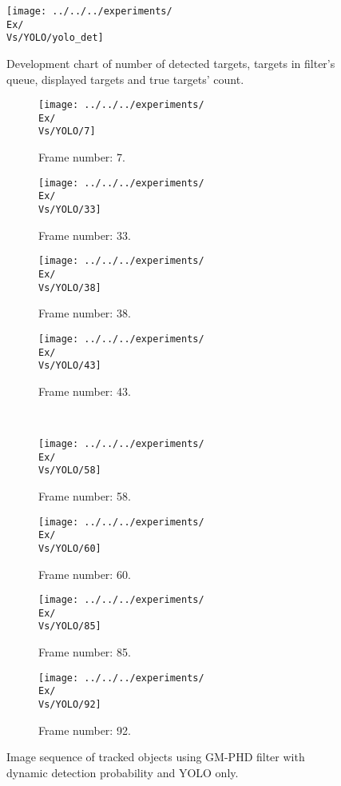 \begin{figure}[H]
    \centering
    \texttt{[image: ../../../experiments/\\Ex/\\Vs/YOLO/yolo\_det]}
    \caption{Development chart of number of detected targets, targets in filter's queue, displayed targets and true targets' count.}
    \label{gr:\Ex-\Vs-\Set}
\end{figure}

\begin{figure}[H]
    \centering
    \begin{subfigure}{0.23\textwidth}
        \centering
        \texttt{[image: ../../../experiments/\\Ex/\\Vs/YOLO/7]}
        \caption{Frame number: 7.}
        \label{fig:\Ex-\Vs-\Set:01}
    \end{subfigure}
    \begin{subfigure}{0.23\textwidth}
        \centering
        \texttt{[image: ../../../experiments/\\Ex/\\Vs/YOLO/33]}
        \caption{Frame number: 33.}
        \label{fig:\Ex-\Vs-\Set:02}
    \end{subfigure}
    \begin{subfigure}{0.23\textwidth}
        \centering
        \texttt{[image: ../../../experiments/\\Ex/\\Vs/YOLO/38]}
        \caption{Frame number: 38.}
        \label{fig:\Ex-\Vs-\Set:03}
    \end{subfigure}
    \begin{subfigure}{0.23\textwidth}
        \centering
        \texttt{[image: ../../../experiments/\\Ex/\\Vs/YOLO/43]}
        \caption{Frame number: 43.}
        \label{fig:\Ex-\Vs-\Set:04}
    \end{subfigure}
    \\
    \begin{subfigure}{0.23\textwidth}
        \centering
        \texttt{[image: ../../../experiments/\\Ex/\\Vs/YOLO/58]}
        \caption{Frame number: 58.}
        \label{fig:\Ex-\Vs-\Set:05}
    \end{subfigure}
    \begin{subfigure}{0.23\textwidth}
        \centering
        \texttt{[image: ../../../experiments/\\Ex/\\Vs/YOLO/60]}
        \caption{Frame number: 60.}
        \label{fig:\Ex-\Vs-\Set:06}
    \end{subfigure}
    \begin{subfigure}{0.23\textwidth}
        \centering
        \texttt{[image: ../../../experiments/\\Ex/\\Vs/YOLO/85]}
        \caption{Frame number: 85.}
        \label{fig:\Ex-\Vs-\Set:07}
    \end{subfigure}
    \begin{subfigure}{0.23\textwidth}
        \centering
        \texttt{[image: ../../../experiments/\\Ex/\\Vs/YOLO/92]}
        \caption{Frame number: 92.}
        \label{fig:\Ex-\Vs-\Set:08}
    \end{subfigure}
    \caption{Image sequence of tracked objects using GM-PHD filter with dynamic detection probability and YOLO only.}
    \label{fig:\Ex-\Vs-\Set}
\end{figure}




